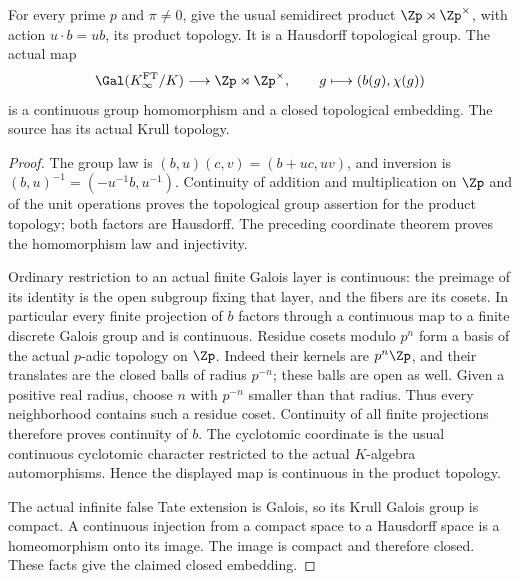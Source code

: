 \begin{lemma}
\label{ft:affine-closed-embedding}
\leanok
For every prime $p$ and $\pi\ne0$, give the usual semidirect product
$\Zp\rtimes\Zp^\times$, with action $u\cdot b=ub$, its product
topology. It is a Hausdorff topological group. The actual map
\[
 \Gal(K^{\mathrm{FT}}_\infty/K)\longrightarrow\Zp\rtimes\Zp^\times,
 \qquad g\longmapsto(b(g),\chi(g))
\]
is a continuous group homomorphism and a closed topological embedding.
The source has its actual Krull topology.
\end{lemma}
\begin{proof}
The group law is $(b,u)(c,v)=(b+uc,uv)$, and inversion is
$(b,u)^{-1}=(-u^{-1}b,u^{-1})$. Continuity of addition and
multiplication on $\Zp$ and of the unit operations proves the
topological group assertion for the product topology; both factors are
Hausdorff. The preceding coordinate theorem proves the homomorphism
law and injectivity.

Ordinary restriction to an actual finite Galois layer is continuous:
the preimage of its identity is the open subgroup fixing that layer,
and the fibers are its cosets. In particular every finite projection
of $b$ factors through a continuous map to a finite discrete Galois
group and is continuous. Residue cosets modulo $p^n$ form a basis of
the actual $p$-adic topology on $\Zp$. Indeed their kernels are
$p^n\Zp$, and their translates are the closed balls of radius $p^{-n}$;
these balls are open as well. Given a positive real radius, choose $n$
with $p^{-n}$ smaller than that radius. Thus every neighborhood contains
such a residue coset. Continuity of all finite projections therefore
proves continuity of $b$. The cyclotomic coordinate is the usual
continuous cyclotomic character restricted to the actual $K$-algebra
automorphisms. Hence the displayed map is continuous in the product
topology.

The actual infinite false Tate extension is Galois, so its Krull Galois
group is compact. A continuous injection from a compact space to a
Hausdorff space is a homeomorphism onto its image. The image is compact
and therefore closed. These facts give the claimed closed embedding.
\end{proof}

